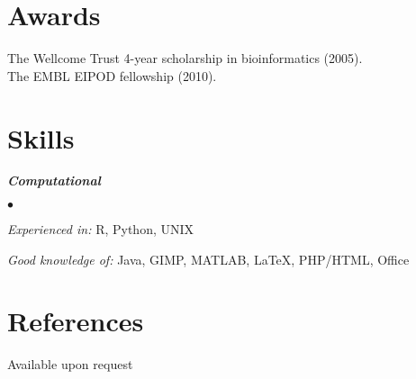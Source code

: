 \documentclass[overlapped, line, 11pt, letterpaper]{res}
\renewenvironment{itemize}{
\begin{list}{$\bullet$}
{\setlength{\itemsep}{0cm}}
}{\end{list}}
\begin{document}
\begin{resume}

\section{Awards}
The Wellcome Trust 4-year scholarship in bioinformatics (2005). \\
The EMBL EIPOD fellowship (2010).

\section{Skills}
\textbf{\emph{Computational}}
\begin{itemize}
\item \emph{Experienced in:} R, Python, UNIX 
\item \emph{Good knowledge of:} Java, GIMP, MATLAB, \LaTeX, PHP/HTML, Office 
\end{itemize}



\section{References}
Available upon request

\end{resume}
\end{document}
